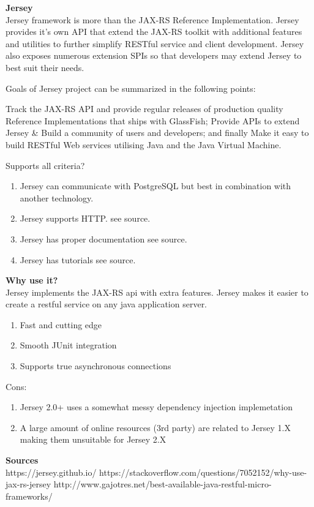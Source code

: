 \textbf{Jersey}\\
Jersey framework is more than the JAX-RS Reference Implementation. Jersey provides it's own API that extend the JAX-RS toolkit with additional features and utilities to further simplify RESTful service and client development. Jersey also exposes numerous extension SPIs so that developers may extend Jersey to best suit their needs.

Goals of Jersey project can be summarized in the following points:

Track the JAX-RS API and provide regular releases of production quality Reference Implementations that ships with GlassFish;
Provide APIs to extend Jersey \& Build a community of users and developers; and finally
Make it easy to build RESTful Web services utilising Java and the Java Virtual Machine.

Supports all criteria? \\
\begin{enumerate}
	\item Jersey can communicate with PostgreSQL but best in combination with another technology.
	\item Jersey supports HTTP. see source.
	\item Jersey has proper documentation see source.
	\item Jersey has tutorials see source.
\end{enumerate}

\textbf{Why use it?} \\
Jersey implements the JAX-RS api with extra features. Jersey makes it easier to create a restful service on any java application server. \\



\begin{enumerate}
	\item Fast and cutting edge
	\item Smooth JUnit integration
	\item Supports true asynchronous connections
\end{enumerate}
Cons:
\begin{enumerate}
	\item Jersey 2.0+ uses a somewhat messy dependency injection implemetation
	\item A large amount of online resources (3rd party) are related to Jersey 1.X making them unsuitable for Jersey 2.X
\end{enumerate}

\textbf{Sources}\\
https://jersey.github.io/
https://stackoverflow.com/questions/7052152/why-use-jax-rs-jersey
http://www.gajotres.net/best-available-java-restful-micro-frameworks/